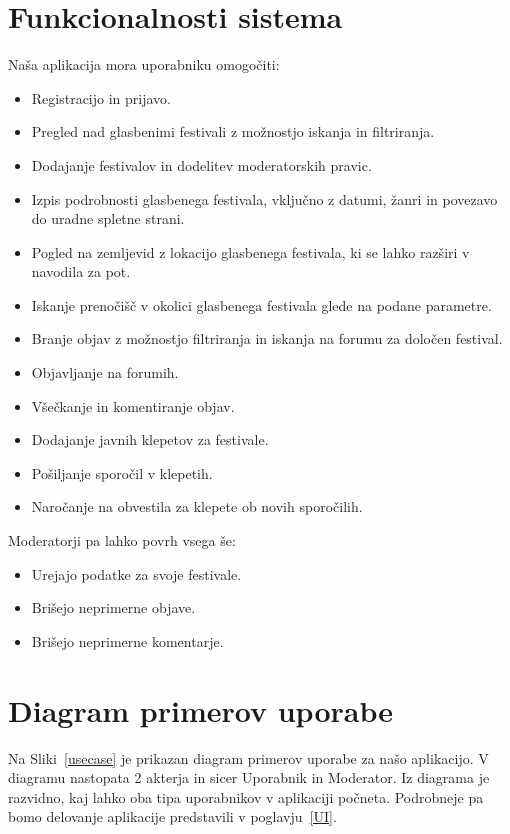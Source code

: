 \documentclass[a4paper,12pt,openright]{book}
\begin{document}
\section{Funkcionalnosti sistema}
Naša aplikacija mora uporabniku omogočiti:
\begin{itemize}
    \item Registracijo in prijavo.
    \item Pregled nad glasbenimi festivali z možnostjo iskanja in filtriranja.
    \item Dodajanje festivalov in dodelitev moderatorskih pravic.
    \item Izpis podrobnosti glasbenega festivala, vključno z datumi, žanri in povezavo do uradne spletne strani.
    \item Pogled na zemljevid z lokacijo glasbenega festivala, ki se lahko razširi v navodila za pot.
    \item Iskanje prenočišč v okolici glasbenega festivala glede na podane parametre.
    \item Branje objav z možnostjo filtriranja in iskanja na forumu za določen festival.
    \item Objavljanje na forumih.
    \item Všečkanje in komentiranje objav.
    \item Dodajanje javnih klepetov za festivale.
    \item Pošiljanje sporočil v klepetih.
    \item Naročanje na obvestila za klepete ob novih sporočilih.
\end{itemize}

Moderatorji pa lahko povrh vsega še:
\begin{itemize}
    \item Urejajo podatke za svoje festivale.
    \item Brišejo neprimerne objave.
    \item Brišejo neprimerne komentarje.
\end{itemize}

\section{Diagram primerov uporabe}
Na Sliki~\ref{usecase} je prikazan diagram primerov uporabe za našo aplikacijo. 
V diagramu nastopata 2 akterja in sicer Uporabnik in Moderator.
Iz diagrama je razvidno, kaj lahko oba tipa uporabnikov v aplikaciji počneta.
Podrobneje pa bomo delovanje aplikacije predstavili v poglavju~\ref{UI}.
\end{document}
